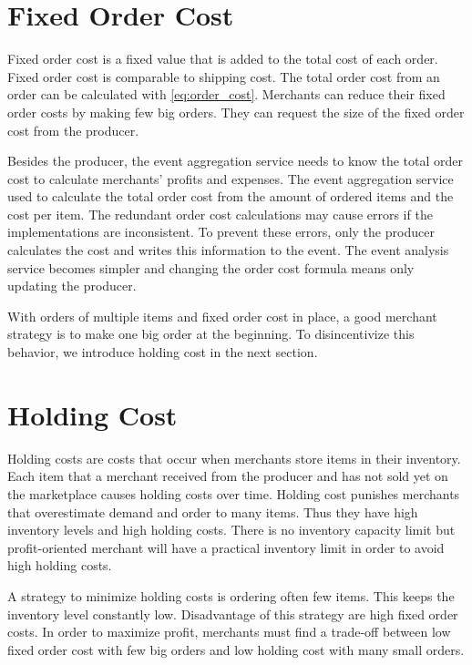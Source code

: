 \section{Fixed Order Cost}
\label{section:fixed_order_cost}
Fixed order cost is a fixed value that is added to the total cost of each order.
Fixed order cost is comparable to shipping cost.
The total order cost from an order can be calculated with \cref{eq:order_cost}.
Merchants can reduce their fixed order costs by making few big orders.
They can request the size of the fixed order cost from the producer.

Besides the producer, the event aggregation service needs to know the total order cost to calculate merchants' profits and expenses.
The event aggregation service used to calculate the total order cost from the amount of ordered items and the cost per item.
The redundant order cost calculations may cause errors if the implementations are inconsistent.
To prevent these errors, only the producer calculates the cost and writes this information to the event.
The event analysis service becomes simpler and changing the order cost formula means only updating the producer.

With orders of multiple items and fixed order cost in place, a good merchant strategy is to make one big order at the beginning.
To disincentivize this behavior, we introduce holding cost in the next section.

\section{Holding Cost}
\label{section:holding_cost}
Holding costs are costs that occur when merchants store items in their inventory.
Each item that a merchant received from the producer and has not sold yet on the marketplace causes holding costs over time.
Holding cost punishes merchants that overestimate demand and order to many items.
Thus they have high inventory levels and high holding costs.
There is no inventory capacity limit but profit-oriented merchant will have a practical inventory limit in order to avoid high holding costs.

A strategy to minimize holding costs is ordering often few items.
This keeps the inventory level constantly low.
Disadvantage of this strategy are high fixed order costs.
In order to maximize profit, merchants must find a trade-off between low fixed order cost with few big orders and low holding cost with many small orders.


